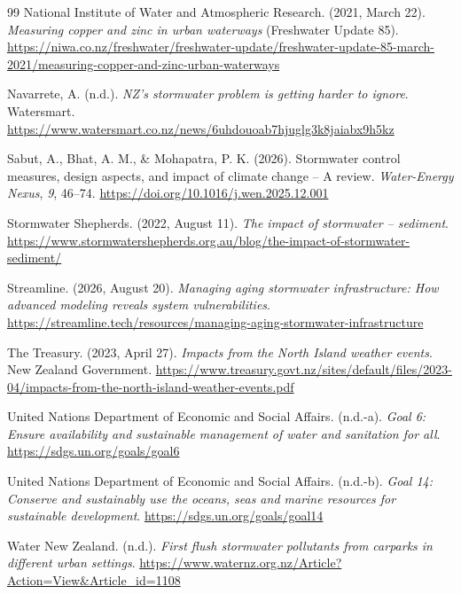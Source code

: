 \documentclass[11pt,a4paper]{article}
\newcommand{\todoref}[1]{\textcolor{red}{\textbf{[#1]}}}
\begin{document}
\begin{thebibliography}{99}
National Institute of Water and Atmospheric Research. (2021, March 22). \textit{Measuring copper and zinc in urban waterways} (Freshwater Update 85). \url{https://niwa.co.nz/freshwater/freshwater-update/freshwater-update-85-march-2021/measuring-copper-and-zinc-urban-waterways}

Navarrete, A. (n.d.). \textit{NZ's stormwater problem is getting harder to ignore}. Watersmart. \url{https://www.watersmart.co.nz/news/6uhdouoab7hjuglg3k8jaiabx9h5kz}

Sabut, A., Bhat, A. M., \& Mohapatra, P. K. (2026). Stormwater control measures, design aspects, and impact of climate change -- A review. \textit{Water-Energy Nexus}, \textit{9}, 46--74. \url{https://doi.org/10.1016/j.wen.2025.12.001}

Stormwater Shepherds. (2022, August 11). \textit{The impact of stormwater -- sediment}. \url{https://www.stormwatershepherds.org.au/blog/the-impact-of-stormwater-sediment/}


Streamline. (2026, August 20). \textit{Managing aging stormwater infrastructure: How advanced modeling reveals system vulnerabilities}. \url{https://streamline.tech/resources/managing-aging-stormwater-infrastructure}

The Treasury. (2023, April 27). \textit{Impacts from the North Island weather events}. New Zealand Government. \url{https://www.treasury.govt.nz/sites/default/files/2023-04/impacts-from-the-north-island-weather-events.pdf}

United Nations Department of Economic and Social Affairs. (n.d.-a). \textit{Goal 6: Ensure availability and sustainable management of water and sanitation for all}. \url{https://sdgs.un.org/goals/goal6}

United Nations Department of Economic and Social Affairs. (n.d.-b). \textit{Goal 14: Conserve and sustainably use the oceans, seas and marine resources for sustainable development}. \url{https://sdgs.un.org/goals/goal14}

Water New Zealand. (n.d.). \textit{First flush stormwater pollutants from carparks in different urban settings}. \url{https://www.waternz.org.nz/Article?Action=View&Article_id=1108}

\end{thebibliography}
\end{document}
